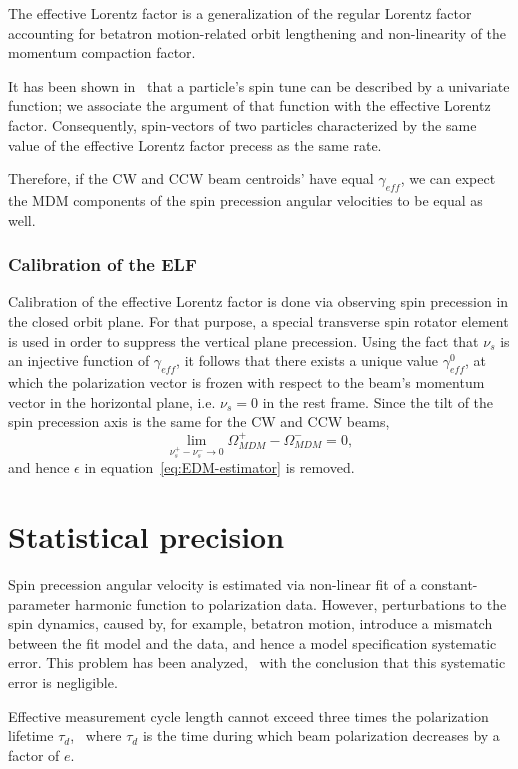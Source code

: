 \documentclass[a4paper]{jpconf}
\newcommand{\W}{\Omega}
\newcommand{\geff}{\gamma_{eff}}
\begin{document}
The effective Lorentz factor is a generalization of the regular Lorentz factor accounting for betatron motion-related orbit lengthening and non-linearity of the momentum compaction factor.

It has been shown in~\cite[p.~56]{Aksentev:Thesis} that a particle's spin tune can be described by a univariate function; we associate the argument of that function with the effective Lorentz factor. Consequently, spin-vectors of two particles characterized by the same value of the effective Lorentz factor precess as the same rate.

Therefore, if the CW and CCW beam centroids' have equal $\geff$, we can expect the MDM components of the spin precession angular velocities to be equal as well.

\subsubsection{Calibration of the ELF}
Calibration of the effective Lorentz factor is done via observing spin precession in the closed orbit plane. For that purpose, a special transverse spin rotator element is used in order to suppress the vertical plane precession.  Using the fact that $\nu_s$ is an injective function of $\geff$, it follows that there exists a unique value $\geff^0$, at which the polarization vector is frozen with respect to the beam's momentum vector in the horizontal plane, i.e. $\nu_s=0$ in the rest frame. Since the tilt of the spin precession axis is the same for the CW and CCW beams,  
\[
\lim_{\nu_s^+ - \nu_s^- \to 0} \W_{MDM}^+ - \W_{MDM}^- = 0,
\]
and hence $\epsilon$ in equation~\eqref{eq:EDM-estimator} is removed.

\section{Statistical precision}
Spin precession angular velocity is estimated via non-linear fit of a constant-parameter harmonic function to polarization data. However, perturbations to the spin dynamics, caused by, for example, betatron motion, introduce a mismatch between the fit model and the data, and hence a model specification systematic error. This problem has been analyzed,~\cite{Aksentev:IPAC19:SMP} with the conclusion that this systematic error is negligible.

Effective measurement cycle length cannot exceed three times the polarization lifetime $\tau_d$,~\cite{Stats} where $\tau_d$ is the time during which beam polarization decreases by a factor of $e$.
\end{document}
